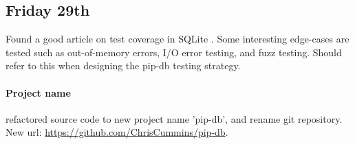 \subsection{Friday 29th}
Found a good article on test coverage in SQLite \cite{SQLiteND}. Some
interesting edge-cases are tested such as out-of-memory errors, I/O error
testing, and fuzz testing. Should refer to this when designing the pip-db
testing strategy.

\paragraph{Project name} refactored source code to new project name 'pip-db',
and rename git repository. New url:
\url{https://github.com/ChrisCummins/pip-db}.
